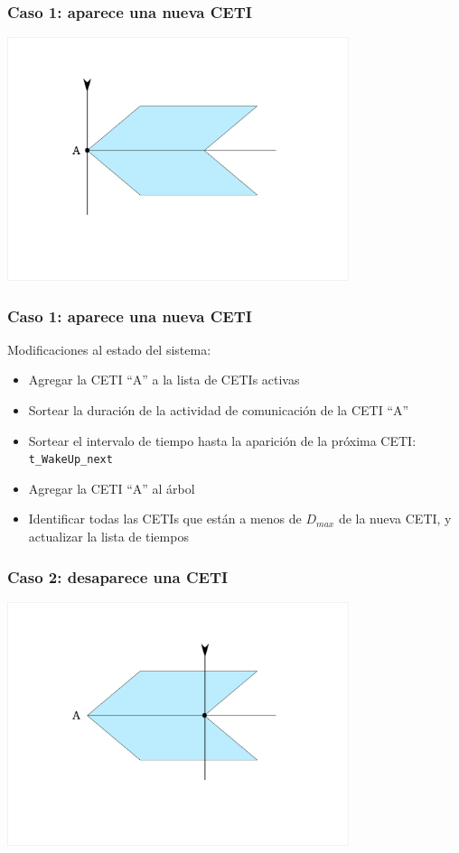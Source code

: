 \documentclass[handout]{beamer}
\theoremstyle{plain}
\theoremstyle{definition}
\theoremstyle{remark}
\begin{document}
\begin{frame}\frametitle{Caso 1: aparece una nueva CETI}
   \centering
   \includegraphics[width=0.75\textwidth]{C1.png}
\end{frame}  %

\begin{frame}\frametitle{Caso 1: aparece una nueva CETI}

   Modificaciones al estado del sistema:
   \begin{itemize}
      \item Agregar la CETI ``A'' a la lista de CETIs activas
      \item Sortear la duración de la actividad de comunicación de la
         CETI ``A''
      \item Sortear el intervalo de tiempo hasta la aparición de la
         próxima CETI: \texttt{t\_WakeUp\_next}
      \item Agregar la CETI ``A'' al árbol
      \item Identificar todas las CETIs que están a menos de $D_{max}$
         de la nueva CETI, y actualizar la lista de tiempos
   \end{itemize}

\end{frame}  %
 
\begin{frame}\frametitle{Caso 2: desaparece una CETI}
   \centering
   \includegraphics[width=0.75\textwidth]{C2.png}
\end{frame}  %
\end{document}
